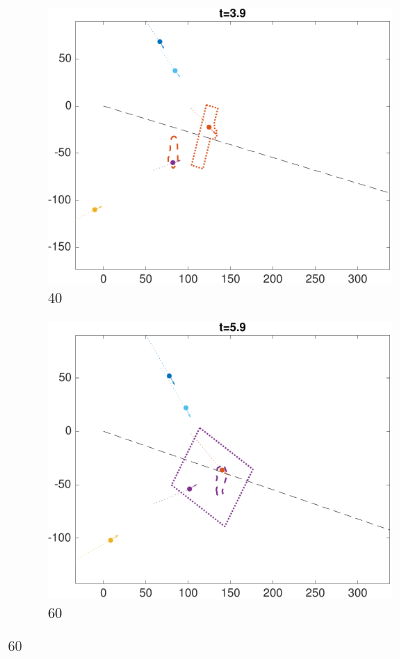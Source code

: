 \begin{figure} \label{fig:fp}
    \centering
    \begin{subfigure}{0.23\textwidth} \label{subfig:fp_40}
        \includegraphics[width=\textwidth]{fig/fp_40}
        \caption{40}
    \end{subfigure}
    \begin{subfigure}{0.23\textwidth} \label{subfig:fp_60}
        \includegraphics[width=\textwidth]{fig/fp_60}
        \caption{60}
    \end{subfigure}


\end{figure}
